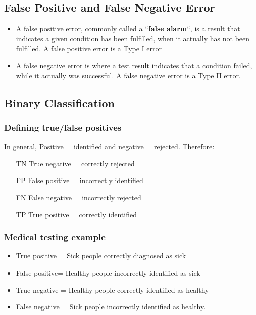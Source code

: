 \documentclass[]{report}
\begin{document}
\subsection*{False Positive and False Negative Error}

\begin{itemize}
	\item 
	A false positive error, commonly called a ``\textbf{false alarm}``, is a result that indicates
	a given condition has been fulfilled, when it actually has not been
	fulfilled. A false positive error is a Type I error %
	\item  A false negative error is where a test result indicates that a condition
	failed, while it actually was successful. A false negative error is a Type II
	error.%
\end{itemize}
\subsection*{Binary Classification}
\subsubsection*{Defining true/false positives}
In general, Positive = identified and negative = rejected. Therefore:

\begin{itemize}
\item[TN] True negative = correctly rejected
\item[FP] False positive = incorrectly identified
\item[FN] False negative = incorrectly rejected
\item[TP] True positive = correctly identified
\end{itemize}
\subsubsection*{Medical testing example}
\begin{itemize}
\item True positive = Sick people correctly diagnosed as sick

\item False positive= Healthy people incorrectly identified as sick

\item True negative = Healthy people correctly identified as healthy

\item False negative = Sick people incorrectly identified as healthy.
\end{itemize}
\newpage
\end{document}

